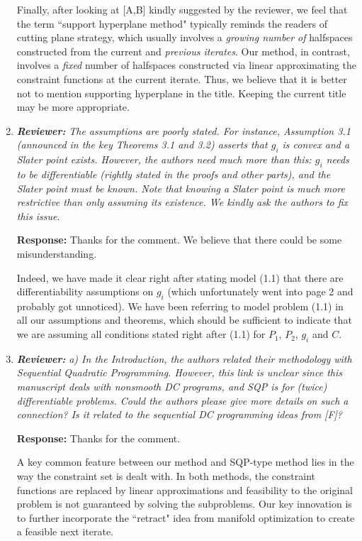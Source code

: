 \documentclass{article}
\begin{document}
\begin{enumerate}
    Finally, after looking at [A,B] kindly suggested by the reviewer, we feel that the term ``support hyperplane method" typically reminds the readers of cutting plane strategy, which usually involves a {\em growing number of} halfspaces constructed from the current and {\em previous iterates}. Our method, in contrast, involves a {\em fixed} number of halfspaces constructed via linear approximating the constraint functions at the current iterate. Thus, we believe that it is better not to mention supporting hyperplane in the title. Keeping the current title may be more appropriate.

    \item \textit{\textbf{Reviewer:}} {\it The assumptions are poorly stated. For instance, Assumption 3.1 (announced in the key Theorems 3.1 and 3.2) asserts that $g_i$ is convex and a Slater point exists. However, the authors need much more than this: $g_i$ needs to be differentiable (rightly stated in the proofs and other parts), and the Slater point must be known. Note that knowing a Slater point is much more restrictive than only assuming its existence. We kindly ask the authors to fix this issue.}

    \textbf{Response:} Thanks for the comment. We believe that there could be some misunderstanding.

    Indeed, we have made it clear right after stating model (1.1) that there are differentiability assumptions on $g_i$ (which unfortunately went into page 2 and probably got unnoticed). We have been referring to model problem (1.1) in all our assumptions and theorems, which should be sufficient to indicate that we are assuming all conditions stated right after (1.1) for $P_1$, $P_2$, $g_i$ and $C$.

	\item \textit{\textbf{Reviewer:}} \textit{ a) In the Introduction, the authors related their methodology with Sequential Quadratic Programming. However, this link is unclear since this manuscript deals with nonsmooth DC programs, and SQP is for (twice) differentiable problems. Could the authors please give more details on such a connection? Is it related to the sequential DC programming ideas from [F]?}
	
	\textbf{Response:} Thanks for the comment.

    A key common feature between our method and SQP-type method lies in the way the constraint set is dealt with. In both methods, the constraint functions are replaced by linear approximations and feasibility to the original problem is not guaranteed by solving the subproblems. Our key innovation is to further incorporate the ``retract" idea from manifold optimization to create a feasible next iterate.


\end{enumerate}
\end{document}
